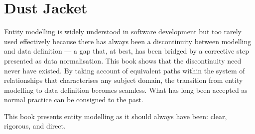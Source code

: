 
\section{Dust Jacket}

Entity modelling is widely understood in software development but too rarely used effectively because there has always been a discontinuity between modelling and data definition --- a gap that, at best, has been bridged by a corrective step presented as data normalisation. This book shows that the discontinuity need never have existed. By taking account of equivalent paths within the system of relationships that characterises any subject domain, the transition from entity modelling to data definition becomes seamless. What has long been accepted as normal practice can be consigned to the past.

This book presents entity modelling as it should always have been: clear, rigorous, and direct.